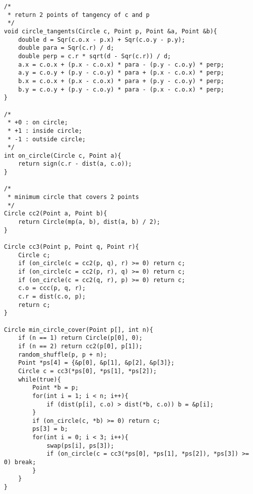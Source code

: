 \begin{verbatim}
/*
 * return 2 points of tangency of c and p
 */
void circle_tangents(Circle c, Point p, Point &a, Point &b){
    double d = Sqr(c.o.x - p.x) + Sqr(c.o.y - p.y);
    double para = Sqr(c.r) / d;
    double perp = c.r * sqrt(d - Sqr(c.r)) / d;
    a.x = c.o.x + (p.x - c.o.x) * para - (p.y - c.o.y) * perp;
    a.y = c.o.y + (p.y - c.o.y) * para + (p.x - c.o.x) * perp;
    b.x = c.o.x + (p.x - c.o.x) * para + (p.y - c.o.y) * perp;
    b.y = c.o.y + (p.y - c.o.y) * para - (p.x - c.o.x) * perp;
}

/*
 * +0 : on circle;
 * +1 : inside circle;
 * -1 : outside circle;
 */
int on_circle(Circle c, Point a){
    return sign(c.r - dist(a, c.o));
}

/*
 * minimum circle that covers 2 points
 */
Circle cc2(Point a, Point b){
    return Circle(mp(a, b), dist(a, b) / 2);
}

Circle cc3(Point p, Point q, Point r){
    Circle c;
    if (on_circle(c = cc2(p, q), r) >= 0) return c;
    if (on_circle(c = cc2(p, r), q) >= 0) return c;
    if (on_circle(c = cc2(q, r), p) >= 0) return c;
    c.o = ccc(p, q, r);
    c.r = dist(c.o, p);
    return c;
}

Circle min_circle_cover(Point p[], int n){
    if (n == 1) return Circle(p[0], 0);
    if (n == 2) return cc2(p[0], p[1]);
    random_shuffle(p, p + n);
    Point *ps[4] = {&p[0], &p[1], &p[2], &p[3]};
    Circle c = cc3(*ps[0], *ps[1], *ps[2]);
    while(true){
        Point *b = p;
        for(int i = 1; i < n; i++){
            if (dist(p[i], c.o) > dist(*b, c.o)) b = &p[i];
        }
        if (on_circle(c, *b) >= 0) return c;
        ps[3] = b;
        for(int i = 0; i < 3; i++){
            swap(ps[i], ps[3]);
            if (on_circle(c = cc3(*ps[0], *ps[1], *ps[2]), *ps[3]) >= 0) break;
        }
    }
}
\end{verbatim}

